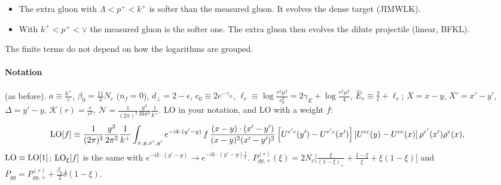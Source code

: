 \documentclass[9pt]{article}
\newcommand{\KK}{\mathcal K}
\numberwithin{equation}{section}
\begin{document}
\begin{itemize}
\begin{itemize}
\item The extra gluon with $\Lambda<p^+<k^+$ is softer than the measured gluon. It evolves the dense target (JIMWLK).
\item With $k^+<p^+<\vee$ the measured gluon is the softer one. The extra gluon then evolves the dilute projectile (linear, BFKL).
\end{itemize}
The finite terms do not depend on how the logarithms are grouped.
\end{itemize}

\paragraph{Notation} (as before). $a\equiv\frac{k^+}{\vee}$, $\beta_0=\frac{11}{3}N_c$ ($n_f=0$), $d_\perp=2-\epsilon$, $c_0\equiv2e^{-\gamma_E}$, $\ell_r\equiv\log\frac{r^2\mu^2}{c_0^2}=2\gamma_E+\log\frac{r^2\mu^2}{4}$, $\hat E_r\equiv\frac2\epsilon+\ell_r$; $X=x-y$, $X'=x'-y'$, $\Delta=y'-y$, $\KK(r)=\frac{r}{r^2}$, $\mathcal N=\frac{1}{(2\pi)^3}\frac{g^4}{16\pi^5}\frac{1}{k^+}$. LO in your notation, and LO with a weight $f$:
\begin{align*}
{\rm LO}[f]&\equiv\frac{1}{(2\pi)^{3}}\frac{g^{2}}{2\pi^{2}}\frac{1}{k^{+}}\int_{x,y,x',y'}e^{-ik\cdot(y'-y)}\,f\,\frac{(x-y)\cdot(x'-y')}{(x-y)^{2}(x'-y')^{2}}\left[U^{e'c}(y')-U^{e'c}(x')\right]\left[U^{ec}(y)-U^{ce}(x)\right]\rho^{e'}(x')\rho^{e}(x),
\end{align*}
${\rm LO}\equiv{\rm LO}[1]$; ${\rm LO}_\xi[f]$ is the same with $e^{-ik\cdot(y'-y)}\to e^{-ik\cdot(y'-y)\frac1\xi}$. $P^{(r)}_{gg,+}(\xi)=2N_c\big[\frac{\xi}{(1-\xi)_+}+\frac{1-\xi}{\xi}+\xi(1-\xi)\big]$ and $P_{gg}=P^{(r)}_{gg,+}+\frac{\beta_0}{2}\delta(1-\xi)$.

\end{document}
